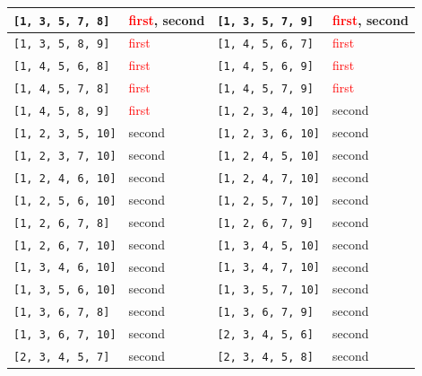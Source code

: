 \begin{longtable}{|p{3.5cm}|p{2.5cm}||p{3.5cm}|p{2.5cm}|}
\texttt{[1, 3, 5, 7, 8]} & \textcolor{red}{first}, \textcolor{CustomBlue}{second} & \texttt{[1, 3, 5, 7, 9]} & \textcolor{red}{first}, \textcolor{CustomBlue}{second} \\ \hline
\texttt{[1, 3, 5, 8, 9]} & \textcolor{red}{first} & \texttt{[1, 4, 5, 6, 7]} & \textcolor{red}{first} \\ \hline
\texttt{[1, 4, 5, 6, 8]} & \textcolor{red}{first} & \texttt{[1, 4, 5, 6, 9]} & \textcolor{red}{first} \\ \hline
\texttt{[1, 4, 5, 7, 8]} & \textcolor{red}{first} & \texttt{[1, 4, 5, 7, 9]} & \textcolor{red}{first} \\ \hline
\texttt{[1, 4, 5, 8, 9]} & \textcolor{red}{first} & \texttt{[1, 2, 3, 4, 10]} & \textcolor{CustomBlue}{second} \\ \hline
\texttt{[1, 2, 3, 5, 10]} & \textcolor{CustomBlue}{second} & \texttt{[1, 2, 3, 6, 10]} & \textcolor{CustomBlue}{second} \\ \hline
\texttt{[1, 2, 3, 7, 10]} & \textcolor{CustomBlue}{second} & \texttt{[1, 2, 4, 5, 10]} & \textcolor{CustomBlue}{second} \\ \hline
\texttt{[1, 2, 4, 6, 10]} & \textcolor{CustomBlue}{second} & \texttt{[1, 2, 4, 7, 10]} & \textcolor{CustomBlue}{second} \\ \hline
\texttt{[1, 2, 5, 6, 10]} & \textcolor{CustomBlue}{second} & \texttt{[1, 2, 5, 7, 10]} & \textcolor{CustomBlue}{second} \\ \hline
\texttt{[1, 2, 6, 7, 8]} & \textcolor{CustomBlue}{second} & \texttt{[1, 2, 6, 7, 9]} & \textcolor{CustomBlue}{second} \\ \hline
\texttt{[1, 2, 6, 7, 10]} & \textcolor{CustomBlue}{second} & \texttt{[1, 3, 4, 5, 10]} & \textcolor{CustomBlue}{second} \\ \hline
\texttt{[1, 3, 4, 6, 10]} & \textcolor{CustomBlue}{second} & \texttt{[1, 3, 4, 7, 10]} & \textcolor{CustomBlue}{second} \\ \hline
\texttt{[1, 3, 5, 6, 10]} & \textcolor{CustomBlue}{second} & \texttt{[1, 3, 5, 7, 10]} & \textcolor{CustomBlue}{second} \\ \hline
\texttt{[1, 3, 6, 7, 8]} & \textcolor{CustomBlue}{second} & \texttt{[1, 3, 6, 7, 9]} & \textcolor{CustomBlue}{second} \\ \hline
\texttt{[1, 3, 6, 7, 10]} & \textcolor{CustomBlue}{second} & \texttt{[2, 3, 4, 5, 6]} & \textcolor{CustomBlue}{second} \\ \hline
\texttt{[2, 3, 4, 5, 7]} & \textcolor{CustomBlue}{second} & \texttt{[2, 3, 4, 5, 8]} & \textcolor{CustomBlue}{second} \\ \hline

\end{longtable}
